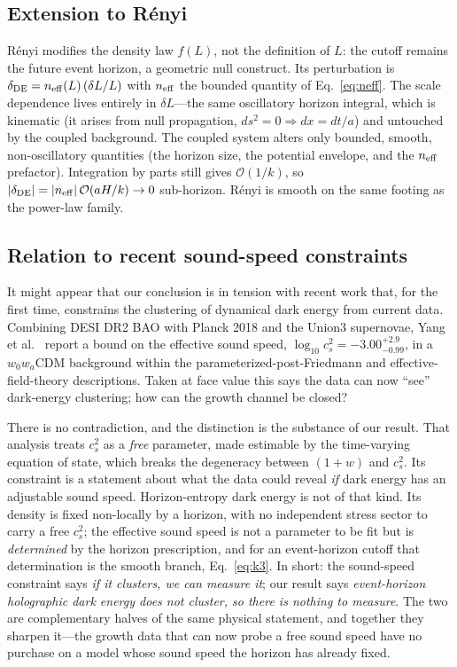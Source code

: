 \documentclass[twocolumn,10pt]{article}
\begin{document}
\subsection{Extension to R\'enyi}

R\'enyi modifies the density law $f(L)$, not the definition of $L$: the cutoff
remains the future event horizon, a geometric null construct. Its perturbation
is $\delta_{\rm DE}=n_{\rm eff}(L)\,(\delta L/L)$ with $n_{\rm eff}$ the bounded
quantity of Eq.~\eqref{eq:neff}. The scale dependence lives entirely in
$\delta L$---the same oscillatory horizon integral, which is kinematic (it
arises from null propagation, $ds^2=0\Rightarrow dx=dt/a$) and untouched by the
coupled background. The coupled system alters only bounded, smooth,
non-oscillatory quantities (the horizon size, the potential envelope, and the
$n_{\rm eff}$ prefactor). Integration by parts still gives $\mathcal{O}(1/k)$,
so $|\delta_{\rm DE}|=|n_{\rm eff}|\,\mathcal{O}(aH/k)\to0$ sub-horizon.
R\'enyi is smooth on the same footing as the power-law family.

\subsection{Relation to recent sound-speed constraints}
\label{sec:pert-clustering}

It might appear that our conclusion is in tension with recent work that, for
the first time, constrains the clustering of dynamical dark energy from
current data. Combining DESI DR2 BAO with Planck 2018 and the Union3 supernovae,
Yang et al.~\cite{Yang2025} report a bound on the effective sound speed,
$\log_{10}c_s^2=-3.00^{+2.9}_{-0.99}$, in a $w_0w_a$CDM background within the
parameterized-post-Friedmann and effective-field-theory descriptions. Taken at
face value this says the data can now ``see'' dark-energy clustering; how can
the growth channel be closed?

There is no contradiction, and the distinction is the substance of our result.
That analysis treats $c_s^2$ as a \emph{free} parameter, made estimable by the
time-varying equation of state, which breaks the degeneracy between $(1+w)$ and
$c_s^2$. Its constraint is a statement about what the data could reveal
\emph{if} dark energy has an adjustable sound speed. Horizon-entropy dark
energy is not of that kind. Its density is fixed non-locally by a horizon, with
no independent stress sector to carry a free $c_s^2$; the effective sound speed
is not a parameter to be fit but is \emph{determined} by the horizon
prescription, and for an event-horizon cutoff that determination is the smooth
branch, Eq.~\eqref{eq:k3}. In short: the sound-speed constraint says
\emph{if it clusters, we can measure it}; our result says \emph{event-horizon
holographic dark energy does not cluster, so there is nothing to measure}. The
two are complementary halves of the same physical statement, and together they
sharpen it---the growth data that can now probe a free sound speed have no
purchase on a model whose sound speed the horizon has already fixed.
\end{document}
